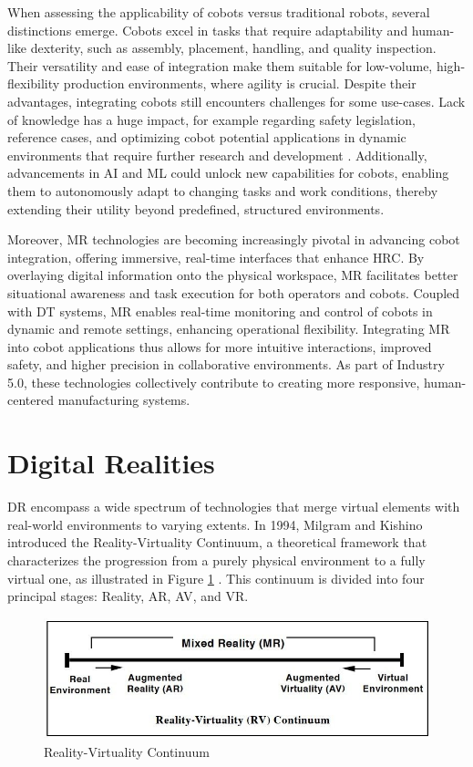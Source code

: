 When assessing the applicability of cobots versus traditional robots, several distinctions emerge. Cobots excel in tasks that require adaptability and human-like dexterity, such as assembly, placement, handling, and quality inspection. Their versatility and ease of integration make them suitable for low-volume, high-flexibility production environments, where agility is crucial. Despite their advantages, integrating cobots still encounters challenges for some use-cases. Lack of knowledge has a huge impact, for example regarding safety legislation, reference cases, and optimizing cobot potential applications in dynamic environments that require further research and development \cite{Aaltonen2019}.
Additionally, advancements in \ac{AI} and \ac{ML} could unlock new capabilities for cobots, enabling them to autonomously adapt to changing tasks and work conditions, thereby extending their utility beyond predefined, structured environments.

Moreover, \ac{MR} technologies are becoming increasingly pivotal in advancing cobot integration, offering immersive, real-time interfaces that enhance \ac{HRC}. By overlaying digital information onto the physical workspace, \ac{MR} facilitates better situational awareness and task execution for both operators and cobots. Coupled with \ac{DT} systems, \ac{MR} enables real-time monitoring and control of cobots in dynamic and remote settings, enhancing operational flexibility. Integrating \ac{MR} into cobot applications thus allows for more intuitive interactions, improved safety, and higher precision in collaborative environments. As part of Industry 5.0, these technologies collectively contribute to creating more responsive, human-centered manufacturing systems.

\section{Digital Realities} 
\ac{DR} encompass a wide spectrum of technologies that merge virtual elements with real-world environments to varying extents. In 1994, Milgram and Kishino introduced the Reality-Virtuality Continuum, a theoretical framework that characterizes the progression from a purely physical environment to a fully virtual one, as illustrated in Figure \ref{f:real-virtual-continuum} \cite{milgram1994}.
This continuum is divided into four principal stages: Reality, \ac{AR}, \ac{AV}, and \ac{VR}.

\begin{figure}[h]
    \centering
    \includegraphics[width=0.9\linewidth]{figs/vr-continuum.png}
    \caption{Reality-Virtuality Continuum~\cite{milgram1994}}
    \label{f:real-virtual-continuum}
\end{figure}

